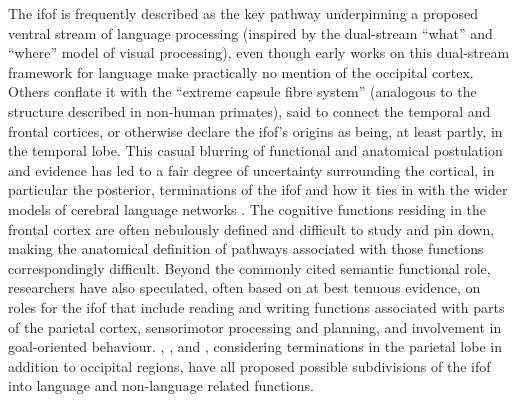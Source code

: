 The \gls{ifof} is frequently described as the key pathway underpinning a proposed ventral stream of language processing\autocite{Duffau2013a,Rollans2018,Voets2017,DavidPoeppel2012} (inspired by the dual-stream ``what'' and ``where'' model of visual processing), even though early works on this dual-stream framework for language make practically no mention of the occipital cortex\autocite{Hickok2004,DavidPoeppel2012,Kummerer2013}.
Others conflate it with the ``extreme capsule fibre system''\autocite{Friederici2013a,Zhang2018} (analogous to the structure described in non-human primates\autocite{Mandonnet2018,ThiebautdeSchotten2012}), said to connect the temporal and frontal cortices\autocite{Kummerer2013},
or otherwise declare the \gls{ifof}'s origins as being, at least partly, in the temporal lobe\autocite{Bajada2015a}.
This casual blurring of functional and anatomical postulation and evidence has led to a fair degree of uncertainty surrounding the cortical, in particular the posterior\autocite{Martino2010,Forkel2014a,Weiller2021}, terminations of the \gls{ifof} and how it ties in with the wider models of cerebral language networks
\autocite{Duffau2013a, Mandonnet2018, Rollans2018, Friederici2013a}.
The cognitive functions residing in the frontal cortex are often nebulously defined and difficult to study and pin down, making the anatomical definition of pathways associated with those functions correspondingly difficult.
Beyond the commonly cited semantic functional role, researchers have also speculated, often based on at best tenuous evidence, on roles for the \gls{ifof} that include reading and writing functions associated with parts of the parietal cortex\autocite{Motomura2014}, sensorimotor processing\autocite{Martino2010} and planning\autocite{Sarubbo2013}, and involvement in goal-oriented behaviour\autocite{Conner2018}.
\textcite{Sarubbo2013}, \textcite{Martino2010}, and \textcite{Rollans2018}, considering terminations in the parietal lobe in addition to occipital regions, have all proposed possible subdivisions of the \gls{ifof} into language and non-language related functions.

